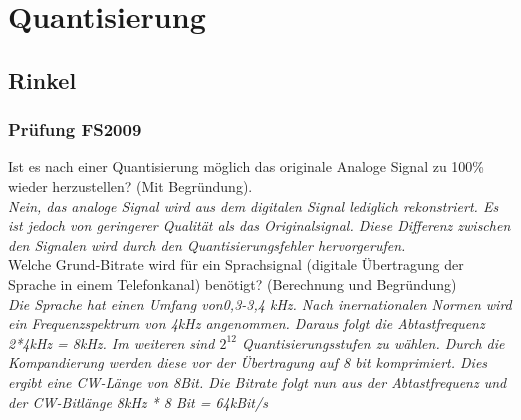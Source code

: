 

\section{Quantisierung}
\subsection{Rinkel}
\subsubsection{Prüfung FS2009}
Ist es nach einer Quantisierung möglich das originale Analoge Signal zu 100\% wieder herzustellen? (Mit Begründung).\\
\textit{Nein, das analoge Signal wird aus dem digitalen Signal lediglich rekonstriert. Es ist jedoch von geringerer Qualität als das Originalsignal. Diese Differenz zwischen den Signalen wird durch
den Quantisierungsfehler hervorgerufen.}\\

Welche Grund-Bitrate wird für ein Sprachsignal (digitale Übertragung der Sprache in einem Telefonkanal) benötigt? (Berechnung und Begründung)\\
\textit{Die Sprache hat einen Umfang von0,3-3,4 kHz. Nach inernationalen Normen wird ein Frequenzspektrum von 4kHz angenommen. Daraus folgt die Abtastfrequenz 2*4kHz = 8kHz. Im weiteren sind $2^12$ Quantisierungsstufen zu wählen. Durch die Kompandierung werden diese vor der Übertragung auf 8 bit komprimiert. Dies ergibt eine CW-Länge von 8Bit. Die
Bitrate folgt nun aus der Abtastfrequenz und der CW-Bitlänge 8kHz * 8 Bit = 64kBit/s}